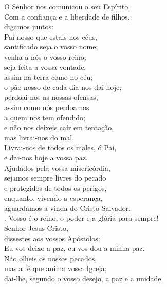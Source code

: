 \documentclass{book}
\begin{document}
\begin{flushleft}
    O Senhor nos comunicou o seu Espírito. \\
    Com a confiança e a liberdade de filhos, \\
    digamos juntos:
    \vspace{.1cm} \\
    Pai nosso que estais nos céus, \\
    santificado seja o vosso nome; \\
    venha a nós o vosso reino, \\
    seja feita a vossa vontade, \\
    assim na terra como no céu; \\
    o pão nosso de cada dia nos dai hoje; \\
    perdoai-nos as nossas ofensas, \\
    assim como nós perdoamos \\
    a quem nos tem ofendido; \\
    e não nos deixeis cair em tentação, \\
    mas livrai-nos do mal.
    \vspace{.1cm} \\
    Livrai-nos de todos os males, ó Pai, \\
    e dai-nos hoje a vossa paz. \\
    Ajudados pela vossa misericórdia, \\
    sejamos sempre livres do pecado \\
    e protegidos de todos os perigos, \\
    enquanto, vivendo a esperança, \\
    aguardamos a vinda do Cristo Salvador.
    \vspace{.1cm} \\
    {\color{red} \Rbar.} Vosso é o reino, o poder e a glória para sempre!
    \vspace{.1cm} \\
    Senhor Jesus Cristo, \\
    dissestes aos vossos Apóstolos: \\
    Eu vos deixo a paz, eu vos dou a minha paz. \\
    Não olheis os nossos pecados, \\
    mas a fé que anima vossa Igreja; \\
    dai-lhe, segundo o vosso desejo, a paz e a unidade.
    \vspace{.1cm} \\

\end{flushleft}
\end{document}
